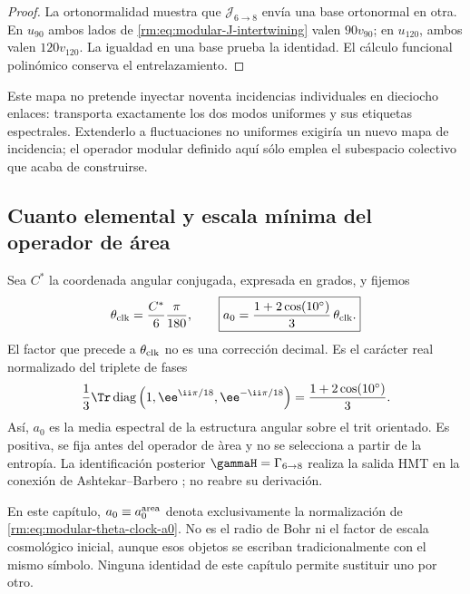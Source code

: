 \begin{proof}
La ortonormalidad muestra que \(\mathcal J_{6\to8}\) env\'ia una base
ortonormal en otra. En \(u_{90}\) ambos lados de
\cref{rm:eq:modular-J-intertwining} valen \(90v_{90}\); en \(u_{120}\),
ambos valen \(120v_{120}\). La igualdad en una base prueba la identidad.
El c\'alculo funcional polin\'omico conserva el entrelazamiento.
\end{proof}

Este mapa no pretende inyectar noventa incidencias individuales en
dieciocho enlaces: transporta exactamente los dos modos uniformes y sus
etiquetas espectrales. Extenderlo a fluctuaciones no uniformes exigir\'ia
un nuevo mapa de incidencia; el operador modular definido aqu\'i s\'olo emplea
el subespacio colectivo que acaba de construirse.

\subsection{Cuanto elemental y escala mínima del operador de área}

Sea \(C^*\) la coordenada angular conjugada, expresada en grados, y fijemos
\begin{equation}
\label{rm:eq:modular-theta-clock-a0}
\theta_{\rm clk}=\frac{C^*}{6}\frac{\pi}{180},
\qquad
\boxed{
a_0=\frac{1+2\cos(10^\circ)}{3}\,\theta_{\rm clk}.}
\end{equation}
El factor que precede a \(\theta_{\rm clk}\) no es una correcci\'on
decimal. Es el car\'acter real normalizado del triplete de fases
\begin{equation}
\label{rm:eq:modular-c10-character}
\frac13\Tr\operatorname{diag}
\left(1,\ee^{\ii\pi/18},\ee^{-\ii\pi/18}\right)
=\frac{1+2\cos(10^\circ)}3.
\end{equation}
As\'i, \(a_0\) es la media espectral de la estructura angular sobre el trit
orientado. Es positiva, se fija antes del operador de \`area y no se
selecciona a partir de la entrop\'ia. La identificaci\'on posterior
\(\gammaH=\Gamma_{6\to8}\) realiza la salida HMT en la conexi\'on de
Ashtekar--Barbero \cite{Barbero1995,Immirzi1997}; no reabre su derivaci\'on.

\begin{remark}
En este cap\'itulo, \(a_0\equiv a_0^{\rm area}\) denota exclusivamente la
normalizaci\'on de \cref{rm:eq:modular-theta-clock-a0}. No es el radio de Bohr
ni el factor de escala cosmol\'ogico inicial, aunque esos objetos se escriban
tradicionalmente con el mismo s\'imbolo. Ninguna identidad de este cap\'itulo
permite sustituir uno por otro.
\end{remark}

